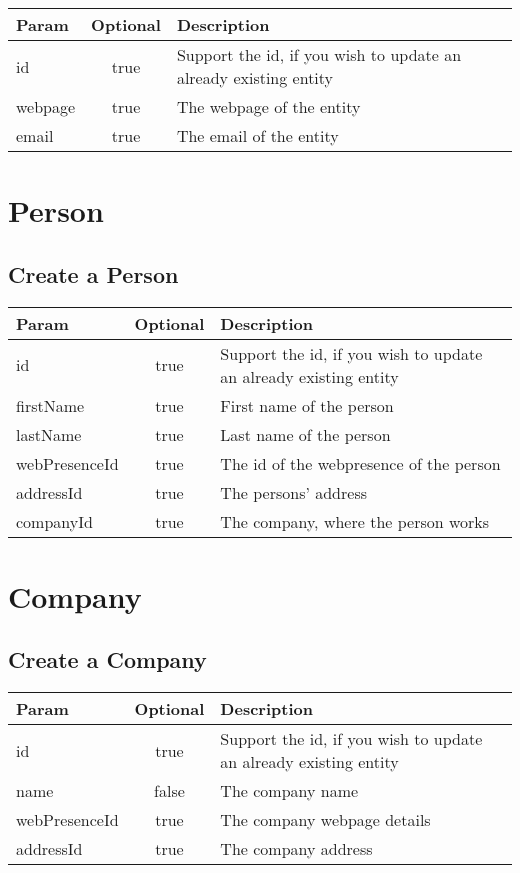\documentclass[a4paper,10pt]{book}
\newcommand{\thead}[1]{\textbf{\large{#1}}}
\begin{document}
\begin{tabular}{l | c | l}
\thead{Param} & \thead{Optional} & \thead{Description}\\
\hline
id & true & Support the id, if you wish to update an already existing entity\\
webpage & true & The webpage of the entity\\
email & true & The email of the entity \\
 
\end{tabular} 

\section{Person}
\label{sec:Person}

\subsection{Create a Person}
\label{s:cPerson}

\begin{tabular}{l | c | l}
\thead{Param} & \thead{Optional} & \thead{Description}\\
\hline
id & true & Support the id, if you wish to update an already existing entity\\
firstName & true & First name of the person\\
lastName & true & Last name of the person\\
webPresenceId & true & The id of the webpresence of the person\\
addressId & true & The persons' address\\
companyId & true & The company, where the person works\\
 
\end{tabular} 


\section{Company}
\label{sec:Company}

\subsection{Create a Company}
\label{s:cCompany}

\begin{tabular}{l | c | l}
\thead{Param} & \thead{Optional} & \thead{Description}\\
\hline
id & true & Support the id, if you wish to update an already existing entity\\
name & false & The company name\\
webPresenceId & true & The company webpage details\\
addressId & true & The company address\\
 
\end{tabular} 
\end{document}
